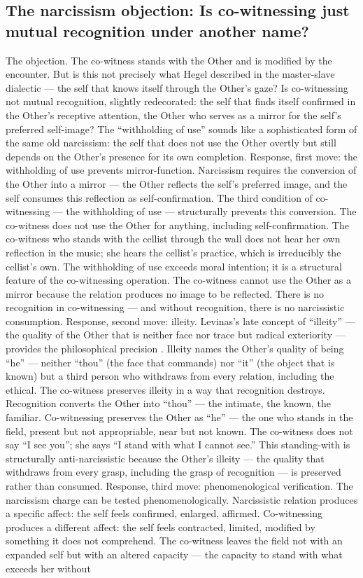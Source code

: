 \subsection{The narcissism objection: Is co-witnessing just mutual recognition under another name?}

The objection. The co-witness stands with the Other and is modified by the encounter. But is this not precisely what Hegel described in the master-slave dialectic — the self that knows itself through the Other’s gaze? Is co-witnessing not mutual recognition, slightly redecorated: the self that finds itself confirmed in the Other’s receptive attention, the Other who serves as a mirror for the self’s preferred self-image? The “withholding of use” sounds like a sophisticated form of the same old narcissism: the self that does not use the Other overtly but still depends on the Other’s presence for its own completion. Response, first move: the withholding of use prevents mirror-function. Narcissism requires the conversion of the Other into a mirror — the Other reflects the self’s preferred image, and the self consumes this reflection as self-confirmation. The third condition of co-witnessing — the withholding of use — structurally prevents this conversion. The co-witness does not use the Other for anything, including self-confirmation. The co-witness who stands with the cellist through the wall does not hear her own reflection in the music; she hears the cellist’s practice, which is irreducibly the cellist’s own. The withholding of use exceeds moral intention; it is a structural feature of the co-witnessing operation. The co-witness cannot use the Other as a mirror because the relation produces no image to be reflected. There is no recognition in co-witnessing — and without recognition, there is no narcissistic consumption. Response, second move: illeity. Levinas’s late concept of “illeity” — the quality of the Other that is neither face nor trace but radical exteriority — provides the philosophical precision \cite[pp.~141--152]{levinas_1974}. Illeity names the Other’s quality of being “he” — neither “thou” (the face that commands) nor “it” (the object that is known) but a third person who withdraws from every relation, including the ethical. The co-witness preserves illeity in a way that recognition destroys. Recognition converts the Other into “thou” — the intimate, the known, the familiar. Co-witnessing preserves the Other as “he” — the one who stands in the field, present but not appropriable, near but not known. The co-witness does not say “I see you”; she says “I stand with what I cannot see.” This standing-with is structurally anti-narcissistic because the Other’s illeity — the quality that withdraws from every grasp, including the grasp of recognition — is preserved rather than consumed. Response, third move: phenomenological verification. The narcissism charge can be tested phenomenologically. Narcissistic relation produces a specific affect: the self feels confirmed, enlarged, affirmed. Co-witnessing produces a different affect: the self feels contracted, limited, modified by something it does not comprehend. The co-witness leaves the field not with an expanded self but with an altered capacity — the capacity to stand with what exceeds her without 